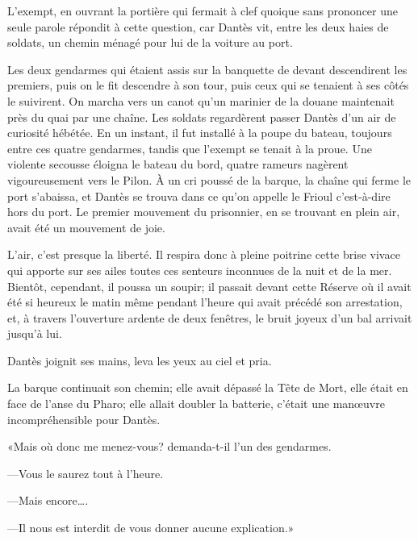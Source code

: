 L'exempt, en ouvrant la portière qui fermait à clef quoique sans prononcer une seule parole répondit à cette question, car Dantès vit, entre les deux haies de soldats, un chemin ménagé pour lui de la voiture au port.

Les deux gendarmes qui étaient assis sur la banquette de devant descendirent les premiers, puis on le fit descendre à son tour, puis ceux qui se tenaient à ses côtés le suivirent. On marcha vers un canot qu'un marinier de la douane maintenait près du quai par une chaîne. Les soldats regardèrent passer Dantès d'un air de curiosité hébétée. En un instant, il fut installé à la poupe du bateau, toujours entre ces quatre gendarmes, tandis que l'exempt se tenait à la proue. Une violente secousse éloigna le bateau du bord, quatre rameurs nagèrent vigoureusement vers le Pilon. À un cri poussé de la barque, la chaîne qui ferme le port s'abaissa, et Dantès se trouva dans ce qu'on appelle le Frioul c'est-à-dire hors du port. Le premier mouvement du prisonnier, en se trouvant en plein air, avait été un mouvement de joie.

L'air, c'est presque la liberté. Il respira donc à pleine poitrine cette brise vivace qui apporte sur ses ailes toutes ces senteurs inconnues de la nuit et de la mer. Bientôt, cependant, il poussa un soupir; il passait devant cette Réserve où il avait été si heureux le matin même pendant l'heure qui avait précédé son arrestation, et, à travers l'ouverture ardente de deux fenêtres, le bruit joyeux d'un bal arrivait jusqu'à lui.

Dantès joignit ses mains, leva les yeux au ciel et pria.

La barque continuait son chemin; elle avait dépassé la Tête de Mort, elle était en face de l'anse du Pharo; elle allait doubler la batterie, c'était une manœuvre incompréhensible pour Dantès.

«Mais où donc me menez-vous? demanda-t-il l'un des gendarmes.

—Vous le saurez tout à l'heure.

—Mais encore\dots.

—Il nous est interdit de vous donner aucune explication.»

